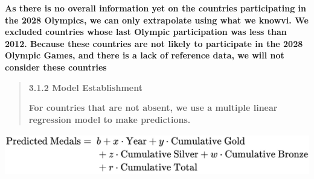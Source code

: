 \documentclass[12pt,a4paper]{article}
\renewenvironment{quote}{\begin{quotation}}{\end{quotation}}  %
\begin{document}
    \textbf{As there is no overall information yet on the countries
    participating in the 2028 Olympics, we can only extrapolate using what
    we knowvi. We excluded countries whose last Olympic participation was
    less than 2012. Because these countries are not likely to participate in
    the 2028 Olympic Games, and there is a lack of reference data, we will
    not consider these countries}
    
    \begin{quote}
    \protect{}\label{bookmark28}{}\textbf{3.1.2 Model
    Establishment}
    
    \textbf{For countries that are not absent, we use a multiple linear
    regression model to make predictions.}
    \end{quote}
    
    \includegraphics[width=5.76in,height=0.71833in]{./media/media/image6.png}
    
\end{document}
